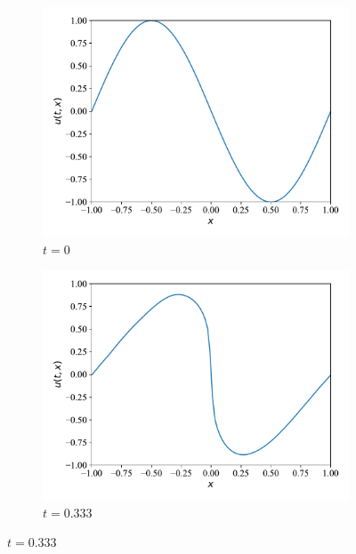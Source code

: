 \begin{figure}[H]
     \centering
     \begin{subfigure}[b]{0.45\textwidth}
         \centering
         \includegraphics[width=\textwidth]{Figures/IntermediateExperiments/Causality/Burger/burger_slice1.pdf}
         \caption{$t = 0$}
         \label{fig:burger_slice1_causal}
     \end{subfigure}
     \hfill
     \begin{subfigure}[b]{0.45\textwidth}
         \centering
         \includegraphics[width=\textwidth]{Figures/IntermediateExperiments/Causality/Burger/burger_slice2.pdf}
         \caption{$t = 0.333$}
         \label{fig:burger_slice2_causal}
     \end{subfigure}

\end{figure}

